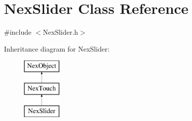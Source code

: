 \hypertarget{class_nex_slider}{\section{Nex\+Slider Class Reference}
\label{class_nex_slider}
}


{\ttfamily \#include $<$Nex\+Slider.\+h$>$}

Inheritance diagram for Nex\+Slider\+:\begin{figure}[H]
\begin{center}
\leavevmode
\includegraphics[height=3.000000cm]{class_nex_slider}
\end{center}
\end{figure}
